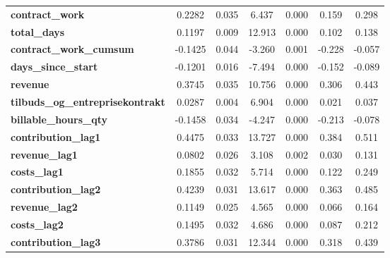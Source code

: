 \begin{center}
\begin{tabular}{lcccccc}
\textbf{contract\_work}                  &       0.2282  &        0.035     &     6.437  &         0.000        &        0.159    &        0.298     \\
\textbf{total\_days}                     &       0.1197  &        0.009     &    12.913  &         0.000        &        0.102    &        0.138     \\
\textbf{contract\_work\_cumsum}          &      -0.1425  &        0.044     &    -3.260  &         0.001        &       -0.228    &       -0.057     \\
\textbf{days\_since\_start}              &      -0.1201  &        0.016     &    -7.494  &         0.000        &       -0.152    &       -0.089     \\
\textbf{revenue}                         &       0.3745  &        0.035     &    10.756  &         0.000        &        0.306    &        0.443     \\
\textbf{tilbuds\_og\_entreprisekontrakt} &       0.0287  &        0.004     &     6.904  &         0.000        &        0.021    &        0.037     \\
\textbf{billable\_hours\_qty}            &      -0.1458  &        0.034     &    -4.247  &         0.000        &       -0.213    &       -0.078     \\
\textbf{contribution\_lag1}              &       0.4475  &        0.033     &    13.727  &         0.000        &        0.384    &        0.511     \\
\textbf{revenue\_lag1}                   &       0.0802  &        0.026     &     3.108  &         0.002        &        0.030    &        0.131     \\
\textbf{costs\_lag1}                     &       0.1855  &        0.032     &     5.714  &         0.000        &        0.122    &        0.249     \\
\textbf{contribution\_lag2}              &       0.4239  &        0.031     &    13.617  &         0.000        &        0.363    &        0.485     \\
\textbf{revenue\_lag2}                   &       0.1149  &        0.025     &     4.565  &         0.000        &        0.066    &        0.164     \\
\textbf{costs\_lag2}                     &       0.1495  &        0.032     &     4.686  &         0.000        &        0.087    &        0.212     \\
\textbf{contribution\_lag3}              &       0.3786  &        0.031     &    12.344  &         0.000        &        0.318    &        0.439     \\

\end{tabular}
\end{center}
